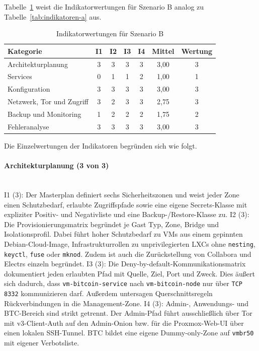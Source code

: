 Tabelle~\ref{tab:indikatoren-b} weist die Indikatorwertungen für Szenario B
analog zu Tabelle~\ref{tab:indikatoren-a} aus.

\begin{table}[H]
\centering
\small
\begin{tabular}{p{} c c c c c c}
\hline
\textbf{Kategorie} & \textbf{I1} & \textbf{I2} & \textbf{I3} & \textbf{I4} & \textbf{Mittel} & \textbf{Wertung} \\
\hline
Architekturplanung        & 3 & 3 & 3 & 3 & 3{,}00 & 3 \\
Services                  & 0 & 1 & 1 & 2 & 1{,}00 & 1 \\
Konfiguration             & 3 & 3 & 3 & 3 & 3{,}00 & 3 \\
Netzwerk, Tor und Zugriff & 3 & 2 & 3 & 3 & 2{,}75 & 3 \\
Backup und Monitoring     & 1 & 2 & 2 & 2 & 1{,}75 & 2 \\
Fehleranalyse             & 3 & 3 & 3 & 3 & 3{,}00 & 3 \\
\hline
\end{tabular}
\caption{Indikatorwertungen für Szenario B}
\label{tab:indikatoren-b}
\end{table}

Die Einzelwertungen der Indikatoren begründen sich wie folgt.

\paragraph{Architekturplanung (3 von 3)} \mbox{}\\
I1 (3): Der Masterplan definiert sechs Sicherheitszonen und weist jeder Zone einen Schutzbedarf, erlaubte Zugriffspfade sowie eine eigene Secrets-Klasse mit expliziter Positiv- und Negativliste und eine Backup-/Restore-Klasse zu.\cite{masterplanB}
I2 (3): Die Provisionierungsmatrix begründet je Gast Typ, Zone, Bridge und Isolationsprofil. Dabei führt hoher Schutzbedarf zu \acp{VM} aus einem gepinnten Debian-Cloud-Image, Infrastrukturrollen zu unprivilegierten \ac{LXC}s ohne \texttt{nesting}, \texttt{keyctl}, \texttt{fuse} oder \texttt{mknod}.
Zudem ist auch die Zurückstellung von Collabora und Electrs einzeln begründet.\cite{masterplanB}
I3 (3): Die Deny-by-default-Kommunikationsmatrix dokumentiert jeden erlaubten Pfad mit Quelle, Ziel, Port und Zweck. Dies äußert sich dadurch, dass \texttt{vm-bitcoin-service} nach \texttt{vm-bitcoin-node} nur über \texttt{TCP 8332} kommunizieren darf.
Außerdem untersagen Querschnittsregeln Rückverbindungen in die Management-Zone.\cite{masterplanB}
I4 (3): Admin-, Anwendungs- und \ac{BTC}-Bereich sind strikt getrennt. Der Admin-Pfad führt ausschließlich über Tor mit v3-Client-Auth auf den Admin-Onion bzw. für die Proxmox-Web-\ac{UI} über einen lokalen \ac{SSH}-Tunnel.
\ac{BTC} bildet eine eigene Dummy-only-Zone auf \texttt{vmbr50} mit eigener Verbotsliste.\cite{masterplanB,finalsummaryB}

